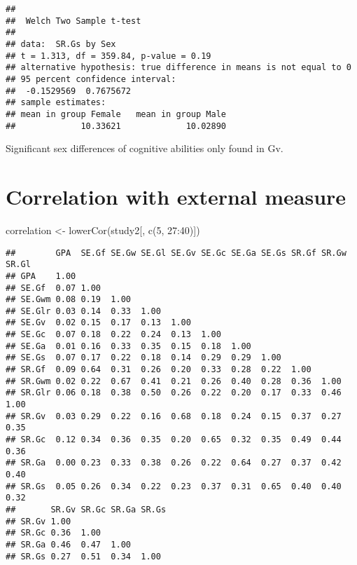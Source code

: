 \documentclass[
]{article}
\newenvironment{Shaded}{\begin{snugshade}}{\end{snugshade}}
\newcommand{\DecValTok}[1]{\textcolor[rgb]{0.00,0.00,0.81}{#1}}
\newcommand{\FunctionTok}[1]{\textcolor[rgb]{0.00,0.00,0.00}{#1}}
\newcommand{\NormalTok}[1]{#1}
\newcommand{\OtherTok}[1]{\textcolor[rgb]{0.56,0.35,0.01}{#1}}
\newcommand{\SpecialCharTok}[1]{\textcolor[rgb]{0.00,0.00,0.00}{#1}}
\begin{document}
\begin{verbatim}
## 
##  Welch Two Sample t-test
## 
## data:  SR.Gs by Sex
## t = 1.313, df = 359.84, p-value = 0.19
## alternative hypothesis: true difference in means is not equal to 0
## 95 percent confidence interval:
##  -0.1529569  0.7675672
## sample estimates:
## mean in group Female   mean in group Male 
##             10.33621             10.02890
\end{verbatim}

Significant sex differences of cognitive abilities only found in Gv.

\hypertarget{correlation-with-external-measure}{%
\section{Correlation with external
measure}\label{correlation-with-external-measure}}

\begin{Shaded}
\begin{Highlighting}[]
\NormalTok{correlation }\OtherTok{\textless{}{-}} \FunctionTok{lowerCor}\NormalTok{(study2[, }\FunctionTok{c}\NormalTok{(}\DecValTok{5}\NormalTok{, }\DecValTok{27}\SpecialCharTok{:}\DecValTok{40}\NormalTok{)])}
\end{Highlighting}
\end{Shaded}

\begin{verbatim}
##        GPA  SE.Gf SE.Gw SE.Gl SE.Gv SE.Gc SE.Ga SE.Gs SR.Gf SR.Gw SR.Gl
## GPA    1.00                                                            
## SE.Gf  0.07 1.00                                                       
## SE.Gwm 0.08 0.19  1.00                                                 
## SE.Glr 0.03 0.14  0.33  1.00                                           
## SE.Gv  0.02 0.15  0.17  0.13  1.00                                     
## SE.Gc  0.07 0.18  0.22  0.24  0.13  1.00                               
## SE.Ga  0.01 0.16  0.33  0.35  0.15  0.18  1.00                         
## SE.Gs  0.07 0.17  0.22  0.18  0.14  0.29  0.29  1.00                   
## SR.Gf  0.09 0.64  0.31  0.26  0.20  0.33  0.28  0.22  1.00             
## SR.Gwm 0.02 0.22  0.67  0.41  0.21  0.26  0.40  0.28  0.36  1.00       
## SR.Glr 0.06 0.18  0.38  0.50  0.26  0.22  0.20  0.17  0.33  0.46  1.00 
## SR.Gv  0.03 0.29  0.22  0.16  0.68  0.18  0.24  0.15  0.37  0.27  0.35 
## SR.Gc  0.12 0.34  0.36  0.35  0.20  0.65  0.32  0.35  0.49  0.44  0.36 
## SR.Ga  0.00 0.23  0.33  0.38  0.26  0.22  0.64  0.27  0.37  0.42  0.40 
## SR.Gs  0.05 0.26  0.34  0.22  0.23  0.37  0.31  0.65  0.40  0.40  0.32 
##       SR.Gv SR.Gc SR.Ga SR.Gs
## SR.Gv 1.00                   
## SR.Gc 0.36  1.00             
## SR.Ga 0.46  0.47  1.00       
## SR.Gs 0.27  0.51  0.34  1.00
\end{verbatim}
\end{document}

